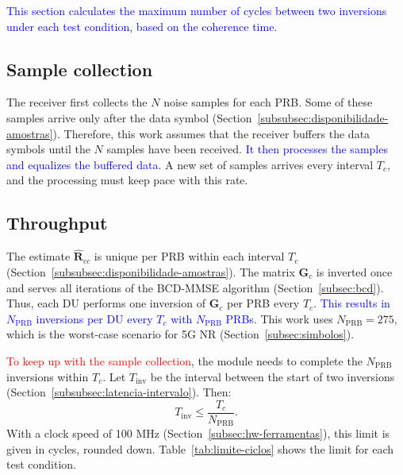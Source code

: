 \textcolor{blue}{This section calculates the maximum number of cycles between two inversions under each test condition, based on the coherence time.}

\subsection{\texorpdfstring{Sample collection}{Sample collection}}\label{subsec:pipeline}
The receiver first collects the $N$ noise samples for each PRB. Some of these samples arrive only after the data symbol (Section~\ref{subsubsec:disponibilidade-amostras}). Therefore, this work assumes that the receiver buffers the data symbols until the $N$ samples have been received. \textcolor{blue}{It then processes the samples and equalizes the buffered data.} A new set of samples arrives every interval $T_c$, and the processing must keep pace with this rate.

\subsection{Throughput}\label{subsec:restricao-vazao}
The estimate $\hat{\mathbf R}_{cc}$ is unique per PRB within each interval $T_c$ (Section~\ref{subsubsec:disponibilidade-amostras}). The matrix $\mathbf G_c$ is inverted once and serves all iterations of the BCD-MMSE algorithm (Section~\ref{subsec:bcd}). Thus, each DU performs one inversion of $\mathbf G_c$ per PRB every $T_c$. \textcolor{blue}{This results in $N_{\text{PRB}}$ inversions per DU every $T_c$ with $N_{\text{PRB}}$ PRBs.} This work uses $N_{\text{PRB}} = 275$, which is the worst-case scenario for 5G NR (Section~\ref{subsec:simbolos}).

\textcolor{red}{To keep up with the sample collection}, the module needs to complete the $N_{\text{PRB}}$ inversions within $T_c$. Let $T_{\text{inv}}$ be the interval between the start of two inversions (Section~\ref{subsubsec:latencia-intervalo}). Then:
\begin{equation}
{T_{\text{inv}} \leq \frac{T_c}{N_{\text{PRB}}}.}
\label{eq:restriction-flow}
\end{equation}
With a clock speed of 100 MHz (Section~\ref{subsec:hw-ferramentas}), this limit is given in cycles, rounded down. Table~\ref{tab:limite-ciclos} shows the limit for each test condition.

